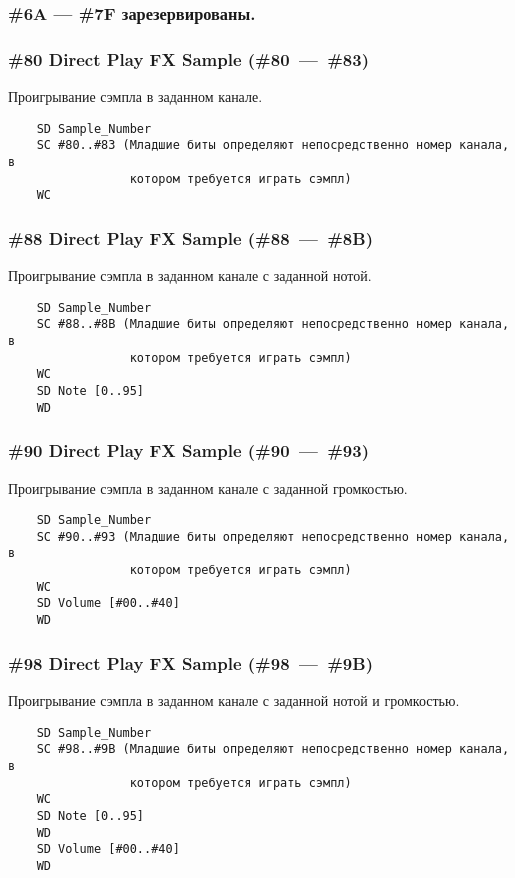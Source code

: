 \documentclass[a4paper,11pt]{article}
\begin{document}
\subsubsection{\#6A --- \#7F зарезервированы.}

\subsubsection{\#80 Direct Play FX Sample (\#80~---~\#83)\label{cmd:80}}
Проигрывание сэмпла в заданном канале.
\begin{verbatim}
    SD Sample_Number
    SC #80..#83 (Младшие биты определяют непосредственно номер канала, в
                 котором требуется играть сэмпл) 
    WC
\end{verbatim}

\subsubsection{\#88 Direct Play FX Sample (\#88~---~\#8B)}
Проигрывание сэмпла в заданном канале с заданной нотой.
\begin{verbatim}
    SD Sample_Number
    SC #88..#8B (Младшие биты определяют непосредственно номер канала, в
                 котором требуется играть сэмпл) 
    WC 
    SD Note [0..95] 
    WD
\end{verbatim}

\subsubsection{\#90 Direct Play FX Sample (\#90~---~\#93)}
Проигрывание сэмпла в заданном канале с заданной громкостью.
\begin{verbatim}
    SD Sample_Number
    SC #90..#93 (Младшие биты определяют непосредственно номер канала, в
                 котором требуется играть сэмпл)
    WC
    SD Volume [#00..#40]
    WD
\end{verbatim}

\subsubsection{\#98 Direct Play FX Sample (\#98~---~\#9B)\label{cmd:9B}}
Проигрывание сэмпла в заданном канале с заданной нотой и громкостью.
\begin{verbatim}
    SD Sample_Number
    SC #98..#9B (Младшие биты определяют непосредственно номер канала, в
                 котором требуется играть сэмпл)
    WC
    SD Note [0..95]
    WD
    SD Volume [#00..#40]
    WD
\end{verbatim}
\end{document}
